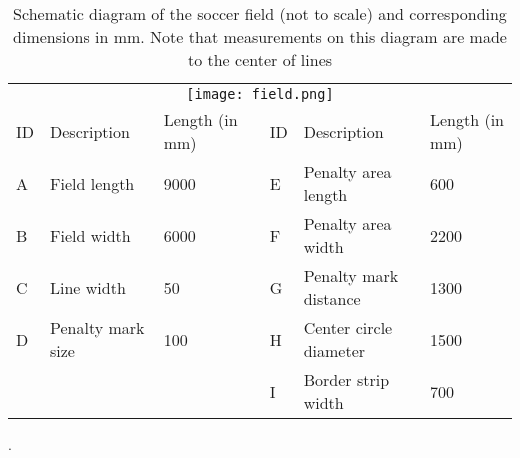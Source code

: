 \begin{table}[h]
\begin{adjustbox}{max width=\textwidth}
\begin{tabular}{lllllll}
\multicolumn{7}{c}{\texttt{[image: field.png]}}\\
\multicolumn{1}{|l|}{ID} & \multicolumn{1}{l|}{Description}       & \multicolumn{1}{l|}{Length (in mm)} & \multicolumn{1}{l|}{} & \multicolumn{1}{l|}{ID} & \multicolumn{1}{l|}{Description}            & \multicolumn{1}{l|}{Length (in mm)} \\ \cline{1-3} \cline{5-7} 
\multicolumn{1}{|l|}{A}  & \multicolumn{1}{l|}{Field length}      & \multicolumn{1}{l|}{9000}           & \multicolumn{1}{l|}{} & \multicolumn{1}{l|}{E}  & \multicolumn{1}{l|}{Penalty area length}    & \multicolumn{1}{l|}{600}            \\ \cline{1-3} \cline{5-7} 
\multicolumn{1}{|l|}{B}  & \multicolumn{1}{l|}{Field width}       & \multicolumn{1}{l|}{6000}           & \multicolumn{1}{l|}{} & \multicolumn{1}{l|}{F}  & \multicolumn{1}{l|}{Penalty area width}     & \multicolumn{1}{l|}{2200}           \\ \cline{1-3} \cline{5-7} 
\multicolumn{1}{|l|}{C}  & \multicolumn{1}{l|}{Line width}        & \multicolumn{1}{l|}{50}             & \multicolumn{1}{l|}{} & \multicolumn{1}{l|}{G}  & \multicolumn{1}{l|}{Penalty mark distance}  & \multicolumn{1}{l|}{1300}           \\ \cline{1-3} \cline{5-7} 
\multicolumn{1}{|l|}{D}  & \multicolumn{1}{l|}{Penalty mark size} & \multicolumn{1}{l|}{100}            & \multicolumn{1}{l|}{} & \multicolumn{1}{l|}{H}  & \multicolumn{1}{l|}{Center circle diameter} & \multicolumn{1}{l|}{1500}           \\ \cline{1-3} \cline{5-7} 
\multicolumn{1}{|l|}{}   & \multicolumn{1}{l|}{}                  & \multicolumn{1}{l|}{}               & \multicolumn{1}{l|}{} & \multicolumn{1}{l|}{I}  & \multicolumn{1}{l|}{Border strip width}     & \multicolumn{1}{l|}{700}           
\end{tabular}
\end{adjustbox}
\caption{Schematic diagram of the soccer field (not to scale) and corresponding dimensions in
  mm. Note that measurements on this diagram are made to the center of lines \cite{Committee2013}}.
\label{tab:field}
\end{table}
